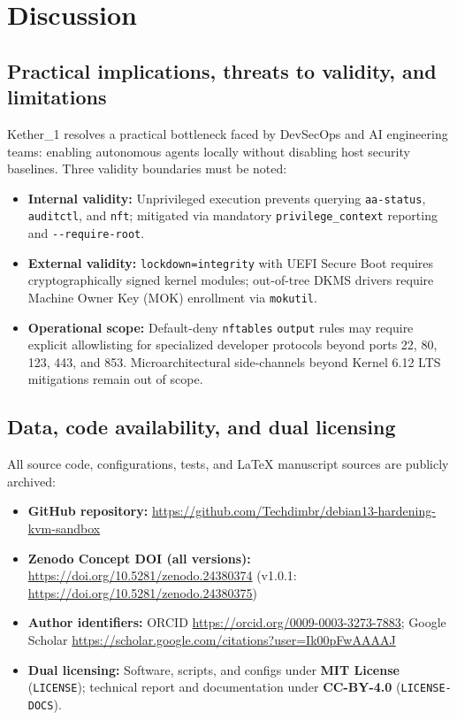 \documentclass[11pt,a4paper]{article}
\newcommand{\code}[1]{\nolinkurl{#1}}
\begin{document}
\section{Discussion}

\subsection{Practical implications, threats to validity, and limitations}

Kether\_1 resolves a practical bottleneck faced by DevSecOps and AI engineering teams: enabling autonomous agents locally without disabling host security baselines. Three validity boundaries must be noted:
\begin{itemize}[leftmargin=1.5em, itemsep=2pt]
  \item \textbf{Internal validity:} Unprivileged execution prevents querying \code{aa-status}, \code{auditctl}, and \code{nft}; mitigated via mandatory \code{privilege_context} reporting and \code{--require-root}.
  \item \textbf{External validity:} \code{lockdown=integrity} with UEFI Secure Boot requires cryptographically signed kernel modules; out-of-tree DKMS drivers require Machine Owner Key (MOK) enrollment via \code{mokutil}.
  \item \textbf{Operational scope:} Default-deny \code{nftables} \code{output} rules may require explicit allowlisting for specialized developer protocols beyond ports 22, 80, 123, 443, and 853. Microarchitectural side-channels beyond Kernel 6.12 LTS mitigations remain out of scope.
\end{itemize}

\subsection{Data, code availability, and dual licensing}

All source code, configurations, tests, and LaTeX manuscript sources are publicly archived:
\begin{itemize}[leftmargin=1.5em, itemsep=2pt]
  \item \textbf{GitHub repository:} \url{https://github.com/Techdimbr/debian13-hardening-kvm-sandbox}
  \item \textbf{Zenodo Concept DOI (all versions):} \url{https://doi.org/10.5281/zenodo.24380374} (v1.0.1: \url{https://doi.org/10.5281/zenodo.24380375})
  \item \textbf{Author identifiers:} ORCID \url{https://orcid.org/0009-0003-3273-7883}; Google Scholar \url{https://scholar.google.com/citations?user=Ik00pFwAAAAJ}
  \item \textbf{Dual licensing:} Software, scripts, and configs under \textbf{MIT License} (\code{LICENSE}); technical report and documentation under \textbf{CC-BY-4.0} (\code{LICENSE-DOCS}).
\end{itemize}
\end{document}
